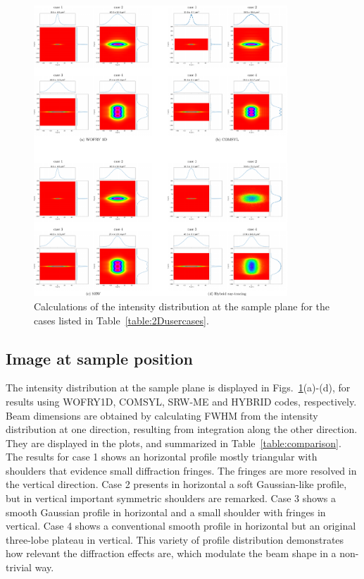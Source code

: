 \documentclass{iucr}              %
\begin{document}
\begin{figure}
    \label{fig:sim_results}
    \includegraphics[width=0.85\textwidth]{figures/fig_sim_results.pdf}
    \caption{Calculations of the intensity distribution at the sample plane for the cases listed in Table~\ref{table:2Dusercases}.}
\end{figure}


\twocolumn

\subsection{Image at sample position}

The intensity distribution at the sample plane is displayed in Figs.~\ref{fig:sim_results}(a)-(d), for results using WOFRY1D, COMSYL, SRW-ME and HYBRID codes, respectively.  Beam dimensions are obtained by calculating FWHM from the intensity distribution at one direction, resulting from integration along the other direction. They are displayed in the plots, and summarized in Table~\ref{table:comparison}.
The results for case 1 shows an horizontal profile mostly triangular with shoulders that evidence small diffraction fringes. The fringes are more resolved in the vertical direction. Case 2  presents in horizontal a soft Gaussian-like profile, but in vertical important symmetric shoulders are remarked. Case 3 shows a smooth Gaussian profile in horizontal and a small shoulder with fringes in vertical. Case 4 shows a conventional smooth profile in horizontal but an original three-lobe plateau in vertical. This variety of profile distribution demonstrates how relevant the diffraction effects are, which modulate the beam shape in a non-trivial way.  
\end{document}
